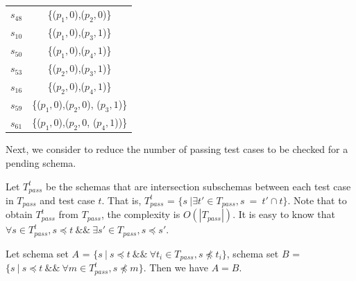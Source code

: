 \begin{table}[htbp]
\begin{tabular}{|c|c|}
   $s_{48}$ & \{($p_{1}, 0$),($p_{2}, 0$)\} \\

   $s_{10}$ & \{($p_{1}, 0$),($p_{3}, 1$)\} \\
   $s_{50}$ & \{($p_{1}, 0$),($p_{4}, 1$)\} \\

   $s_{53}$ & \{($p_{2}, 0$),($p_{3}, 1$)\} \\
   $s_{16}$ & \{($p_{2}, 0$),($p_{4}, 1$)\} \\

   $s_{59}$ & \{($p_{1}, 0$),($p_{2}, 0$), ($p_{3}, 1$)\} \\
   $s_{61}$ & \{($p_{1}, 0$),($p_{2}, 0$,  ($p_{4}, 1$))\} \\ \hline
    \end{tabular}%
\end{table}



Next, we consider to reduce the number of passing test cases to be checked for a pending schema.

Let $T_{pass}^{t}$ be the schemas that are intersection subschemas between each test case in $T_{pass}$ and test case $t$. That is, $T_{pass}^{t}$ = $\{ s\ | \exists t' \in  T_{pass}, s\ =\ t' \cap t \}$. Note that to obtain $T_{pass}^{t}$ from $T_{pass}$, the complexity is $O(|T_{pass}|)$.  It is easy to know that $\forall s \in T_{pass}^{t}, s \preceq t \ \&\& \ \exists s' \in T_{pass}, s \preceq s'$.


\begin{proposition}\label{pro:healthysintequal}
Let schema set $A$ = $\{ s\ |\ s \preceq t\ \&\&\  \forall t_{i} \in T_{pass}, s \npreceq t_{i} \} $,  schema set $B$ = $\{ s\ |\ s \preceq t\ \&\&\ \forall m \in T_{pass}^{t}, s \npreceq m \}$. Then we have $A = B$.
\end{proposition}

